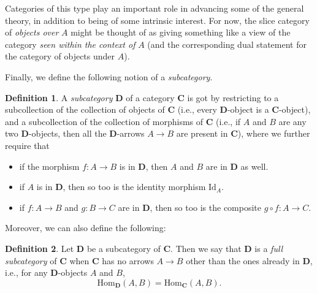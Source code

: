 \documentclass[a4paper]{book}
\theoremstyle{definition}
\theoremstyle{definition}
\newtheorem{definition}{Definition}[section]
\theoremstyle{definition}
\theoremstyle{theorem}
\theoremstyle{definition}
\begin{document}
	Categories of this type play an important role in advancing some of the general theory, in addition to being of some intrinsic interest. For now, the slice category of \textit{objects over} $A$ might be thought of as giving something like a view of the category \textit{seen within the context of} $A$ (and the corresponding dual statement for the category of objects under $A$). \par  
Finally, we define the following notion of a \textit{subcategory}. 
\begin{definition}
	A \textit{subcategory}  $\textbf{D}$ of a category $\textbf{C}$ is got by restricting to a subcollection of the collection of objects of $\textbf{C}$ (i.e., every $\textbf{D}$-object is a $\textbf{C}$-object), and a subcollection of the collection of morphisms of $\textbf{C}$ (i.e., if $A$ and $B$ are any two $\textbf{D}$-objects, then all the $\textbf{D}$-arrows $A \rightarrow B$ are present in $\textbf{C}$), where we further require that
	\begin{itemize}
		\item if the morphism $f: A \rightarrow B$ is in $\textbf{D}$, then $A$ and $B$ are in $\textbf{D}$ as well. 
		\item if $A$ is in $\textbf{D}$, then so too is the identity morphism $\text{Id}_A$. 
		\item if $f: A \rightarrow B$ and $g: B \rightarrow C$ are in $\textbf{D}$, then so too is the composite $g \circ f: A \rightarrow C$. 
	\end{itemize}
\end{definition} \noindent 
Moreover, we can also define the following: 
\begin{definition}
	Let $\textbf{D}$ be a subcategory of $\textbf{C}$. Then we say that $\textbf{D}$ is a \textit{full subcategory}  of $\textbf{C}$ when $\textbf{C}$ has no arrows $A \rightarrow B$ other than the ones already in $\textbf{D}$, i.e., for any $\textbf{D}$-objects $A$ and $B$, 
	\begin{equation*}
	\text{Hom}_{\textbf{D}}(A, B) = \text{Hom}_{\textbf{C}}(A, B).
	\end{equation*}
\end{definition}
\end{document}
